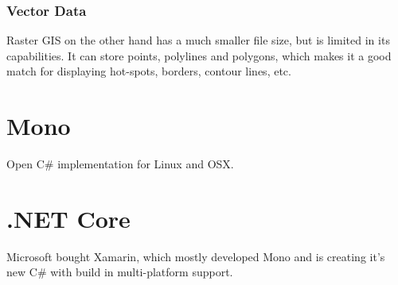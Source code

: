 \subsubsection{Vector Data}
Raster GIS on the other hand has a much smaller file size, but is limited in its capabilities. It can store points, polylines and polygons, which makes it a good match for displaying hot-spots, borders, contour lines, etc.



\section{Mono}
Open C\# implementation for Linux and OSX.



\section{.NET Core}
Microsoft bought Xamarin, which mostly developed Mono and is creating it's new C\# with build in multi-platform support.